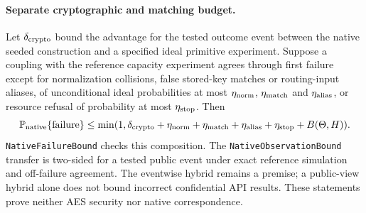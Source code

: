 \documentclass[11pt]{article}
\theoremstyle{definition}
\theoremstyle{remark}
\newcommand{\Prb}{\mathbb P}
\begin{document}
\paragraph{Separate cryptographic and matching budget.}
Let $\delta_{\rm crypto}$ bound the advantage for the tested outcome event
between the native seeded construction and a specified ideal primitive experiment. Suppose a
coupling with the reference capacity experiment agrees through first failure
except for normalization collisions, false stored-key matches or routing-input
aliases, of unconditional ideal probabilities at most $\eta_{\rm norm}$,
$\eta_{\rm match}$ and $\eta_{\rm alias}$, or resource refusal of probability
at most $\eta_{\rm stop}$. Then
\[
 \Prb_{\rm native}\{\mathrm{failure}\}
 \le \min(1,\delta_{\rm crypto}+\eta_{\rm norm}
              +\eta_{\rm match}+\eta_{\rm alias}+\eta_{\rm stop}+B(\Theta,H)).
\]
\texttt{NativeFailureBound} checks this composition.
The \texttt{NativeObservationBound} transfer is two-sided for a tested public
event under exact reference simulation and off-failure
agreement. The eventwise hybrid remains a premise; a public-view hybrid
alone does not bound incorrect confidential API results. These statements
prove neither AES security nor native correspondence.
\end{document}

